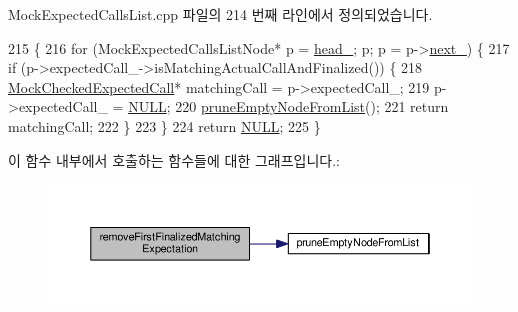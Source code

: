 Mock\+Expected\+Calls\+List.\+cpp 파일의 214 번째 라인에서 정의되었습니다.


\begin{DoxyCode}
215 \{
216     \textcolor{keywordflow}{for} (MockExpectedCallsListNode* p = \hyperlink{class_mock_expected_calls_list_a18290c3c0a206882dd8e0d9f446e2fe6}{head\_}; p; p = p->\hyperlink{class_mock_expected_calls_list_1_1_mock_expected_calls_list_node_aaae452a372ae14c06a6d5d252df73725}{next\_}) \{
217         \textcolor{keywordflow}{if} (p->expectedCall\_->isMatchingActualCallAndFinalized()) \{
218             \hyperlink{class_mock_checked_expected_call}{MockCheckedExpectedCall}* matchingCall = p->expectedCall\_;
219             p->expectedCall\_ = \hyperlink{openavb__types__base__pub_8h_a070d2ce7b6bb7e5c05602aa8c308d0c4}{NULL};
220             \hyperlink{class_mock_expected_calls_list_aeb4c1dd9901800365e942770b132c94b}{pruneEmptyNodeFromList}();
221             \textcolor{keywordflow}{return} matchingCall;
222         \}
223     \}
224     \textcolor{keywordflow}{return} \hyperlink{openavb__types__base__pub_8h_a070d2ce7b6bb7e5c05602aa8c308d0c4}{NULL};
225 \}
\end{DoxyCode}


이 함수 내부에서 호출하는 함수들에 대한 그래프입니다.\+:
\nopagebreak
\begin{figure}[H]
\begin{center}
\leavevmode
\includegraphics[width=350pt]{class_mock_expected_calls_list_a1a73fba9891c64207b06fb3f83fdad75_cgraph}
\end{center}
\end{figure}




